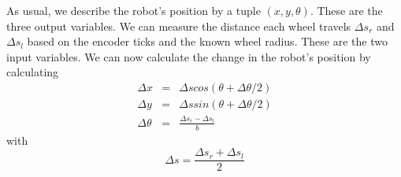 As usual, we describe the robot's position by a tuple $ (x,y,\theta)$. These are the three output variables. We can measure the distance each wheel travels $ \Delta s_r$ and $ \Delta s_l$ based on the encoder ticks and the known wheel radius. These are the two input variables. We can now calculate the change in the robot's position by calculating
\begin{eqnarray}
\Delta x  &=& \Delta s cos(\theta+\Delta \theta /2)\\
\Delta y  &=& \Delta s sin(\theta+\Delta \theta/2)\\
\Delta \theta &=& \frac{\Delta s_r-\Delta s_l}{b}
\end{eqnarray}
with
\begin{equation}
\Delta s=\frac{\Delta s_r + \Delta s_l}{2}
\end{equation}

